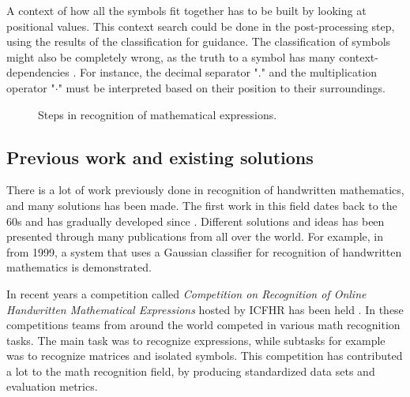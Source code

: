 A context of how all the symbols fit together has to be built by looking at positional values. This context search could be done in the post-processing step, using the results of the classification for guidance. The classification of symbols might also be completely wrong, as the truth to a symbol has many context-dependencies \cite{zanibbi_recognition_2012}. For instance, the decimal separator "." and the multiplication operator "$\cdot$" must be interpreted based on their position to their surroundings. 

\begin{figure}[H]
\centering
    \caption{Steps in recognition of mathematical expressions.}

\label{fig:steps_in_math_recog}
\end{figure}

\subsection{Previous work and existing solutions}
\label{previous_work_existing_solutions}
There is a lot of work previously done in recognition of handwritten mathematics, and many solutions has been made. The first work in this field dates back to the 60s and has gradually developed since \cite{mouchere_icfhr2016_2016}. Different solutions and ideas has been presented through many publications from all over the world. For example, in \cite{matsakis_recognition_????} from 1999, a system that uses a Gaussian classifier for recognition of handwritten mathematics is demonstrated.

In recent years a competition called \textit{Competition on Recognition of Online Handwritten Mathematical Expressions} hosted by ICFHR has been held \cite{mouchere_icfhr2016_2016} \cite{mouchere_advancing_2016}. In these competitions teams from around the world competed in various math recognition tasks. The main task was to recognize expressions, while subtasks for example was to recognize matrices and isolated symbols. This competition has contributed a lot to the math recognition field, by producing standardized data sets and evaluation metrics.

